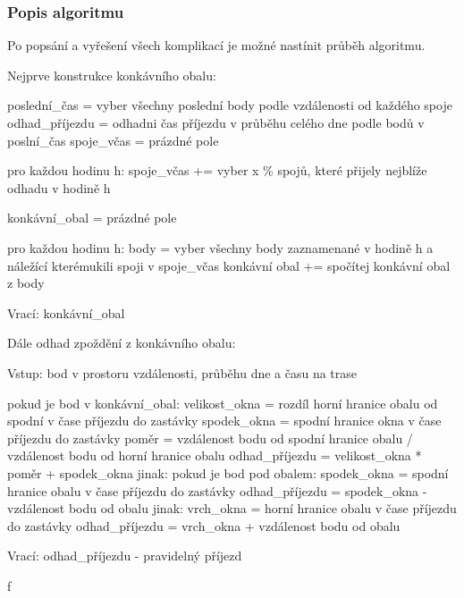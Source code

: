 \subsubsection{Popis algoritmu}

Po popsání a vyřešení všech komplikací je možné nastínit průběh algoritmu.

\bigbreak

Nejprve konstrukce konkávního obalu:

\begin{code}[frame=none]
poslední_čas = vyber všechny poslední body podle vzdálenosti od každého spoje
odhad_příjezdu = odhadni čas příjezdu v průběhu celého dne podle bodů v poslní_čas
spoje_včas = prázdné pole

pro každou hodinu h:
    spoje_včas += vyber x \% spojů, které přijely nejblíže odhadu v hodině h

konkávní_obal = prázdné pole

pro každou hodinu h:
    body = vyber všechny body zaznamenané v hodině h a náležící kterémukili spoji v spoje_včas
    konkávní obal += spočítej konkávní obal z body

Vrací: konkávní_obal
\end{code}

Dále odhad zpoždění z konkávního obalu:

\begin{code}[frame=none]
Vstup: bod v prostoru vzdálenosti, průběhu dne a času na trase

pokud je bod v konkávní_obal:
    velikost_okna = rozdíl horní hranice obalu od spodní v čase příjezdu do zastávky
    spodek_okna = spodní hranice okna v čase příjezdu do zastávky
    poměr = vzdálenost bodu od spodní hranice obalu / vzdálenost bodu od horní hranice obalu
    odhad_příjezdu = velikost_okna * poměr + spodek_okna
jinak:
    pokud je bod pod obalem:
        spodek_okna = spodní hranice obalu v čase příjezdu do zastávky
        odhad_příjezdu = spodek_okna - vzdálenost bodu od obalu
    jinak:
        vrch_okna = horní hranice obalu v čase příjezdu do zastávky
        odhad_příjezdu = vrch_okna + vzdálenost bodu od obalu

Vrací: odhad_příjezdu - pravidelný příjezd
\end{code}













































f
